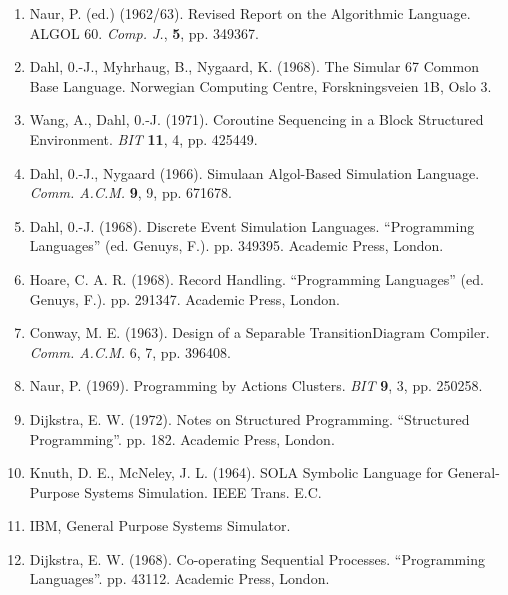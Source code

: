 \documentclass[twoside,11pt]{book}
\begin{document}
\begin{enumerate}[leftmargin=*, itemsep=.1em, wide=0pt, align=left, label=(\arabic*)]
	\item \label{ref:1}
	Naur, P. (ed.) (1962/63). Revised Report on the Algorithmic Language. ALGOL 60. \textit{Comp. J.}, \textbf{5}, pp. 349\textendash{}367.
	
	\item \label{ref:2}
	Dahl, 0.-J., Myhrhaug, B., Nygaard, K. (1968). The Simular 67 Common Base Language. Norwegian Computing Centre, Forskningsveien 1B, Oslo 3.
	
	\item \label{ref:3}
	Wang, A., Dahl, 0.-J. (1971). Coroutine Sequencing in a Block Structured Environment. \textit{BIT} \textbf{11}, 4, pp. 425\textendash{}449.
	
	\item \label{ref:4}
	Dahl, 0.-J., Nygaard (1966). Simula\textemdash{}an Algol-Based Simulation Language. \textit{Comm. A.C.M.} \textbf{9}, 9, pp. 671\textendash{}678. 
	
	\item \label{ref:5}
	Dahl, 0.-J. (1968). Discrete Event Simulation Languages. ``Programming Languages'' (ed. Genuys, F.). pp. 349\textendash{}395. Academic Press, London.
	
	\item \label{ref:6}
	Hoare, C. A. R. (1968). Record Handling. ``Programming Languages'' (ed. Genuys, F.). pp. 291\textendash{}347. Academic Press, London.
	
	\item \label{ref:7}
	Conway, M. E. (1963). Design of a Separable Transition\textemdash{}Diagram Compiler. \textit{Comm. A.C.M.} 6, 7, pp. 396\textendash{}408.
	
	\item \label{ref:8}
	Naur, P. (1969). Programming by Actions Clusters. \textit{BIT} \textbf{9}, 3, pp. 250\textendash{}258.
	
	\item \label{ref:9}
	Dijkstra, E. W. (1972). Notes on Structured Programming. ``Structured Programming''. pp. 1\textendash{}82. Academic Press, London.
	
	\item \label{ref:10}
	Knuth, D. E., McNeley, J. L. (1964). SOL\textemdash{}A Symbolic Language for General-Purpose Systems Simulation. IEEE Trans. E.C.
	
	\item \label{ref:11}
	IBM, General Purpose Systems Simulator.
	
	\item \label{ref:12}
	Dijkstra, E. W. (1968). Co-operating Sequential Processes. ``Programming Languages''. pp. 43\textendash{}112. Academic Press, London.
\end{enumerate}
\clearpage

\backmatter
\end{document}
